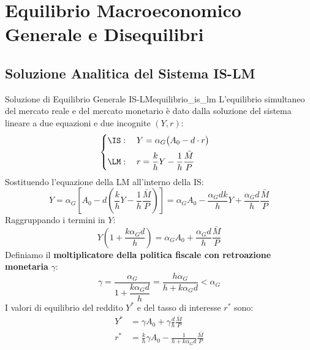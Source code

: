 \section{Equilibrio Macroeconomico Generale e Disequilibri}

\subsection{Soluzione Analitica del Sistema IS-LM}

\begin{teorema}{Soluzione di Equilibrio Generale IS-LM}{equilibrio_is_lm}
L'equilibrio simultaneo del mercato reale e del mercato monetario è dato dalla soluzione del sistema lineare a due equazioni e due incognite $(Y, r)$:
\begin{equation}
    \begin{cases}
        \IS: \quad Y = \alpha_G \big( A_0 - d \cdot r \big) \\[0.5em]
        \LM: \quad r = \dfrac{k}{h} Y - \dfrac{1}{h}\dfrac{\bar{M}}{P}
    \end{cases}
\end{equation}
Sostituendo l'equazione della LM all'interno della IS:
\begin{equation}
    Y = \alpha_G \left[ A_0 - d \left( \frac{k}{h} Y - \frac{1}{h}\frac{\bar{M}}{P} \right) \right] = \alpha_G A_0 - \frac{\alpha_G d k}{h} Y + \frac{\alpha_G d}{h}\frac{\bar{M}}{P}
\end{equation}
Raggruppando i termini in $Y$:
\begin{equation}
    Y \left( 1 + \frac{k \alpha_G d}{h} \right) = \alpha_G A_0 + \frac{\alpha_G d}{h}\frac{\bar{M}}{P}
\end{equation}
Definiamo il \textbf{moltiplicatore della politica fiscale con retroazione monetaria} $\gamma$:
\begin{equation}
    \gamma = \frac{\alpha_G}{1 + \dfrac{k \alpha_G d}{h}} = \frac{h \alpha_G}{h + k \alpha_G d} < \alpha_G \label{eq:gamma_fiscale}
\end{equation}
I valori di equilibrio del reddito $Y^*$ e del tasso di interesse $r^*$ sono:
\begin{align}
    Y^* &= \gamma A_0 + \gamma \frac{d}{h}\frac{\bar{M}}{P} \label{eq:y_star} \\[0.6em]
    r^* &= \frac{k}{h} \gamma A_0 - \frac{1}{h + k \alpha_G d}\frac{\bar{M}}{P} \label{eq:r_star}
\end{align}
\end{teorema}

